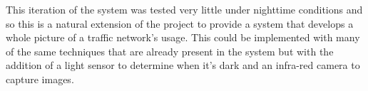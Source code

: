 This iteration of the system was tested very little under nighttime conditions and so this is a natural extension of the project to provide a system that develops a whole picture of a traffic network's usage. This could be implemented with many of the same techniques that are already present in the system but with the addition of a light sensor to determine when it's dark and an infra-red camera to capture images. 